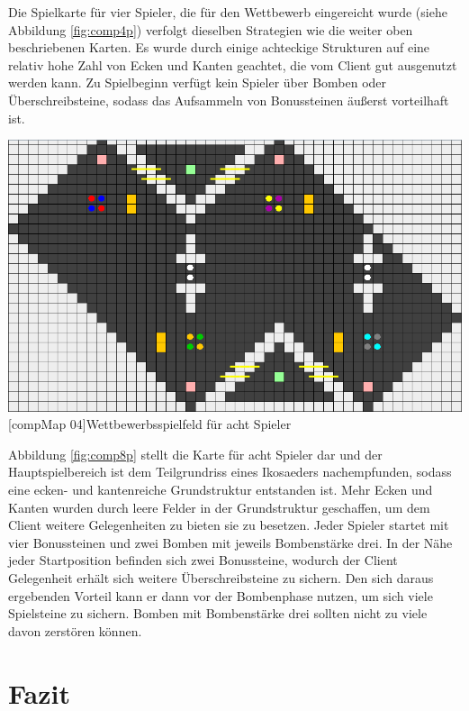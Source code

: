 \documentclass[12pt,a4paper,bibliography=totocnumbered,listof=totocnumbered,ngerman]{scrartcl}
\begin{document}
Die Spielkarte für vier Spieler, die für den Wettbewerb eingereicht wurde (siehe Abbildung \ref{fig:comp4p}) verfolgt dieselben Strategien wie die weiter oben beschriebenen Karten. Es wurde durch einige achteckige Strukturen auf eine relativ hohe Zahl von Ecken und Kanten geachtet, die vom Client gut ausgenutzt werden kann. Zu Spielbeginn verfügt kein Spieler über Bomben oder Überschreibsteine, sodass das Aufsammeln von Bonussteinen äußerst vorteilhaft ist.


\vspace{1em}
\begin{minipage}{\linewidth}
	\centering
	\includegraphics[width=0.6\linewidth]{pics/comp2019_04_8p.png}
	[compMap 04]{Wettbewerbsspielfeld für acht Spieler}
	\label{fig:comp8p}
\end{minipage}
\vspace{1em}

Abbildung \ref{fig:comp8p} stellt die Karte für acht Spieler dar und der Hauptspielbereich ist dem Teilgrundriss eines Ikosaeders nachempfunden, sodass eine ecken- und kantenreiche Grundstruktur entstanden ist. Mehr Ecken und Kanten wurden durch leere Felder in der Grundstruktur geschaffen, um dem Client weitere Gelegenheiten zu bieten sie zu besetzen. Jeder Spieler startet mit vier Bonussteinen und zwei Bomben mit jeweils Bombenstärke drei. In der Nähe jeder Startposition befinden sich zwei Bonussteine, wodurch der Client Gelegenheit erhält sich weitere Überschreibsteine zu sichern. Den sich daraus ergebenden Vorteil kann er dann vor der Bombenphase nutzen, um sich viele Spielsteine zu sichern. Bomben mit Bombenstärke drei sollten nicht zu viele davon zerstören können. 

\newpage
\section{Fazit}
\end{document}
